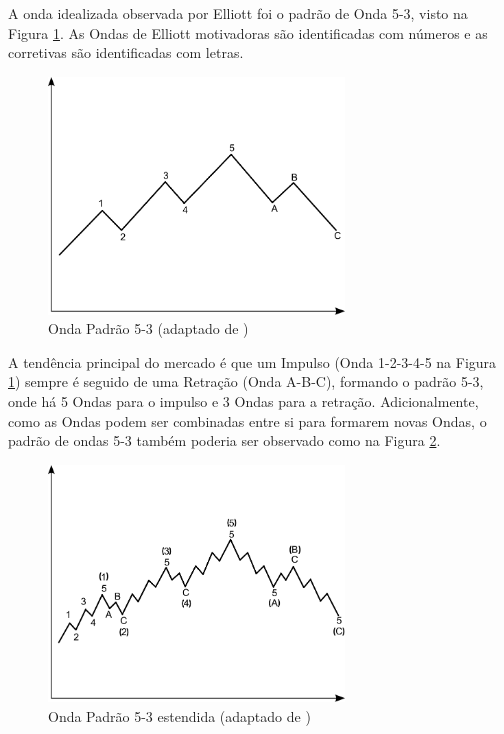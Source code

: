 \documentclass[12pt]{article}
\begin{document}
A onda idealizada observada por Elliott foi o padrão de Onda 5-3, visto na Figura
\ref{fig:ElliottWave5-3}.
As Ondas de Elliott motivadoras são identificadas com números e as corretivas são
identificadas com letras.

\begin{figure}[H]
	\centering
	\includegraphics[width=0.7\textwidth]{ElliottWave5-3.png}
	\caption{Onda Padrão 5-3 (adaptado de \cite{Masur})}\label{fig:ElliottWave5-3}
\end{figure}

A tendência principal do mercado é que um Impulso (Onda 1-2-3-4-5 na
Figura \ref{fig:ElliottWave5-3}) sempre é seguido de uma Retração (Onda A-B-C), formando o
padrão 5-3, onde há 5 Ondas para o impulso e 3 Ondas para a retração.
Adicionalmente, como as Ondas podem ser combinadas entre si para formarem novas Ondas,
o padrão de ondas 5-3 também poderia ser observado como na Figura
\ref{fig:ElliottWave5-3_extended}.

\begin{figure}[H]
	\centering
	\includegraphics[width=0.7\textwidth]{ElliottWave5-3_extended.png}
	\caption{Onda Padrão 5-3 estendida (adaptado de \cite{Masur})}
	\label{fig:ElliottWave5-3_extended}
\end{figure}
\end{document}
